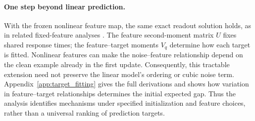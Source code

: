 \paragraph{One step beyond linear prediction.}
With the frozen nonlinear feature map, the same exact readout solution
holds, as in related fixed-feature analyses
\citep{bonnaire2025dynamical,george2025denoisingscorematchingrandom}.
The feature second-moment matrix $U$ fixes shared response times; the feature--target
moments $V_q$ determine how each target is fitted.
Nonlinear features can make the noise--feature relationship depend on the
clean example already in the first update. Consequently, this tractable
extension need not preserve the linear model's ordering or cubic noise term.
Appendix~\ref{app:target_fitting} gives the full derivations and shows how
variation in feature--target relationships determines the initial expected
gap. Thus the analysis identifies mechanisms under specified initialization
and feature choices, rather than a universal ranking of prediction targets.
